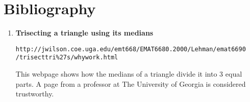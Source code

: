 \documentclass[letterpaper,12pt,twoside]{report}
\begin{document}
		\chapter*{Bibliography}
	
		\begin{enumerate}
			\item \textbf{Trisecting a triangle using its medians} \par\texttt{http://jwilson.coe.uga.edu/emt668/EMAT6680.2000/Lehman/emat6690\\/trisecttri\%27s/whywork.html}\par This webpage shows how the medians of a triangle divide it into 3 equal parts. A page from a professor at The University of Georgia is considered trustworthy.
		\end{enumerate}
\end{document}
